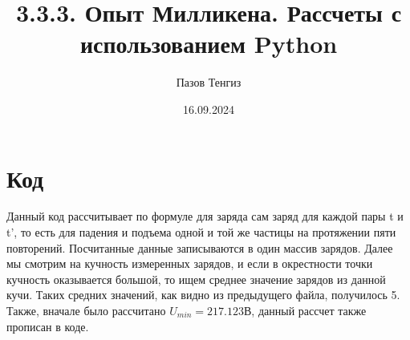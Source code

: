 \documentclass[a4paper,12pt]{article}
\author{Пазов Тенгиз}
\title{3.3.3. Опыт Милликена. Рассчеты с использованием Python}
\date{16.09.2024}
\begin{document}
\maketitle
\newpage
\section{Код} 
Данный код рассчитывает по формуле для заряда сам заряд для каждой пары t и t', то есть для падения и подъема одной и той же частицы на протяжении пяти повторений. Посчитанные данные записываются в один массив зарядов. Далее мы смотрим на кучность измеренных зарядов, и если в окрестности точки кучность оказывается большой, то ищем среднее значение зарядов из данной кучи. Таких средних значений, как видно из предыдущего файла, получилось 5. Также, вначале было рассчитано $U_{min} = 217.123 В$, данный рассчет также прописан в коде.\newline
\end{document}
